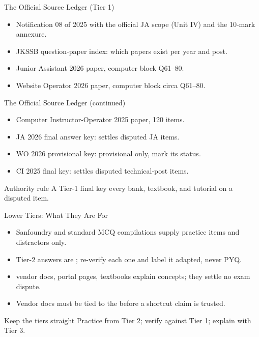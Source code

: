 \documentclass[aspectratio=169]{beamer}
\begin{document}
\begin{frame}{The Official Source Ledger (Tier 1)}
  \begin{itemize}
    \item {} Notification 08 of 2025 with the official JA scope (Unit IV) and the 10-mark annexure.
    \item {} JKSSB question-paper index: which papers exist per year and post.
    \item {} Junior Assistant 2026 paper, computer block Q61--80.
    \item {} Website Operator 2026 paper, computer block circa Q61--80.
  \end{itemize}
\end{frame}

\begin{frame}{The Official Source Ledger (continued)}
  \begin{itemize}
    \item {} Computer Instructor-Operator 2025 paper, 120 items.
    \item {} JA 2026 final answer key: settles disputed JA items.
    \item {} WO 2026 provisional key: provisional only, mark its status.
    \item {} CI 2025 final key: settles disputed technical-post items.
  \end{itemize}
  \begin{alertblock}{Authority rule}
    A Tier-1 final key  every bank, textbook, and tutorial on a disputed item.
  \end{alertblock}
\end{frame}

\begin{frame}{Lower Tiers: What They Are For}
  \begin{itemize}
    \item {} Sanfoundry and standard MCQ compilations supply practice items and distractors only.
    \item Tier-2 answers are ; re-verify each one and label it adapted, never PYQ.
    \item {} vendor docs, portal pages, textbooks explain concepts; they settle no exam dispute.
    \item Vendor docs must be tied to the  before a shortcut claim is trusted.
  \end{itemize}
  \begin{block}{Keep the tiers straight}
    Practice from Tier 2; verify against Tier 1; explain with Tier 3.
  \end{block}
\end{frame}
\end{document}
